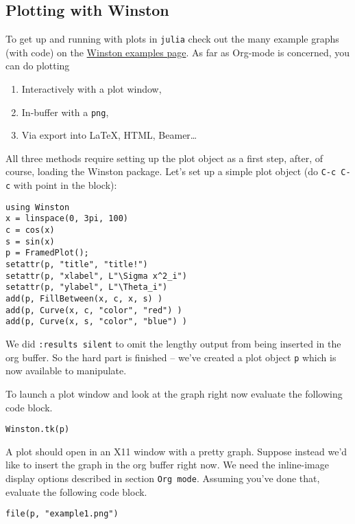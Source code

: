 \documentclass[11pt]{article}
\begin{document}
\subsection[Plotting with Winston]{Plotting with Winston}
\label{sec-3-1}

To get up and running with plots in \texttt{julia} check out the many example
graphs (with code) on the \href{https://github.com/nolta/Winston.jl/blob/master/doc/examples.md}{Winston examples page}. As far as Org-mode is
concerned, you can do plotting

\begin{enumerate}
\item Interactively with a plot window,
\item In-buffer with a \texttt{png},
\item Via export into \LaTeX{}, HTML, Beamer\ldots{}
\end{enumerate}

All three methods require setting up the plot object as a first step,
after, of course, loading the Winston package.  Let's set up a simple
plot object (do \texttt{C-c C-c} with point in the block):

\begin{verbatim}
using Winston
x = linspace(0, 3pi, 100)
c = cos(x)
s = sin(x)
p = FramedPlot();
setattr(p, "title", "title!")
setattr(p, "xlabel", L"\Sigma x^2_i")
setattr(p, "ylabel", L"\Theta_i")
add(p, FillBetween(x, c, x, s) )
add(p, Curve(x, c, "color", "red") )
add(p, Curve(x, s, "color", "blue") )
\end{verbatim}

We did \texttt{:results silent} to omit the lengthy output from being
inserted in the org buffer. So the hard part is finished -- we've
created a plot object \texttt{p} which is now available to manipulate.

To launch a plot window and look at the graph right now evaluate the
following code block.

\begin{verbatim}
Winston.tk(p)
\end{verbatim}

A plot should open in an X11 window with a pretty graph. Suppose
instead we'd like to insert the graph in the org buffer right now. We
need the inline-image display options described in section \texttt{Org
mode}. Assuming you've done that, evaluate the following code block.

\begin{verbatim}
file(p, "example1.png")
\end{verbatim}
\end{document}
